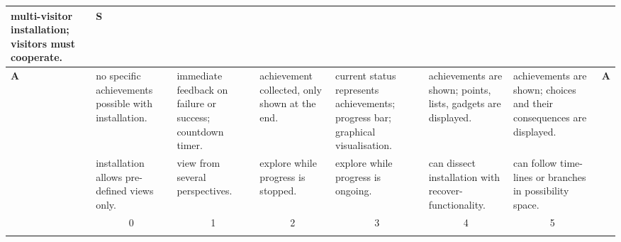 \begin{sidewaystable}
\begin{tabular}{|l|p{.13\hsize}|p{.13\hsize}|p{.13\hsize}|p{.13\hsize}|p{.13\hsize}|p{.13\hsize}|l|}
multi-visitor installation; visitors must cooperate. &
\multirow{4}{*}{\bf S} \\
\hline
\multirow{4}{*}{\bf A}&
no specific achievements possible with installation. &
immediate feedback on failure or success; countdown timer. &
achievement collected, only shown at the end. &
current status represents achievements; progress bar; graphical visualisation. &
achieve\-ments are shown; points, lists, gadgets are displayed. &
achievements are shown; choices and their consequences are displayed. &
\multirow{4}{*}{\bf A} \\
\hline
\multirow{4}{*}{\bf E}&
installation allows pre-defined views only. &
view from several perspectives. &
explore while progress is stopped. &
explore while progress is ongoing. &
can dissect installation with recover-functionality. &
can follow time-lines or bran\-ches in possibility space. &
\multirow{4}{*}{\bf E} \\
\hline
\multicolumn{1}{l|}{}&\multicolumn{1}{c|}{0}&\multicolumn{1}{c|}{1}&\multicolumn{1}{c|}{2}&\multicolumn{1}{c|}{3}&\multicolumn{1}{c|}{4}&\multicolumn{1}{c|}{5}&\multicolumn{1}{l}{}\\
\cline{2-7}
\end{tabular}
\end{sidewaystable}
